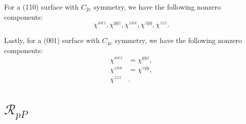 For a (110) surface with $C_{2v}$ symmetry, we have the following nonzero
components: 
\begin{equation}\label{eqapp:nonzero110}
\chi^{xxz}, \chi^{yyz}, \chi^{zxx}, \chi^{zyy}, \chi^{zzz}.
\end{equation}

Lastly, for a (001) surface with $C_{4v}$ symmetry, we have the following
nonzero components:
\begin{equation}\label{eqapp:nonzero001}
\begin{split}
\chi^{xxz}&=\chi^{yyz},\\
\chi^{zxx}&=\chi^{zyy},\\
\chi^{zzz}&.
\end{split}
\end{equation}



\section{\texorpdfstring{$\mathcal{R}_{pP}$}{RpP}}

